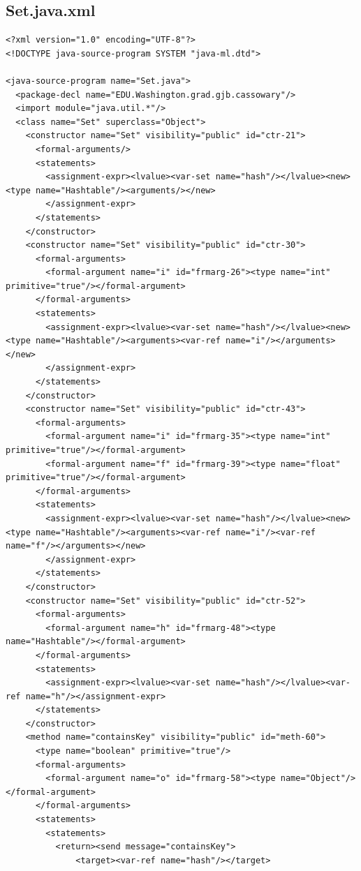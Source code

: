 \documentclass{article}
\begin{document}
\subsection{Set.java.xml}

{\small
\begin{verbatim}
<?xml version="1.0" encoding="UTF-8"?>
<!DOCTYPE java-source-program SYSTEM "java-ml.dtd">

<java-source-program name="Set.java">
  <package-decl name="EDU.Washington.grad.gjb.cassowary"/>
  <import module="java.util.*"/>
  <class name="Set" superclass="Object">
    <constructor name="Set" visibility="public" id="ctr-21">
      <formal-arguments/>
      <statements>
        <assignment-expr><lvalue><var-set name="hash"/></lvalue><new><type name="Hashtable"/><arguments/></new>
        </assignment-expr>
      </statements>
    </constructor>
    <constructor name="Set" visibility="public" id="ctr-30">
      <formal-arguments>
        <formal-argument name="i" id="frmarg-26"><type name="int" primitive="true"/></formal-argument>
      </formal-arguments>
      <statements>
        <assignment-expr><lvalue><var-set name="hash"/></lvalue><new><type name="Hashtable"/><arguments><var-ref name="i"/></arguments></new>
        </assignment-expr>
      </statements>
    </constructor>
    <constructor name="Set" visibility="public" id="ctr-43">
      <formal-arguments>
        <formal-argument name="i" id="frmarg-35"><type name="int" primitive="true"/></formal-argument>
        <formal-argument name="f" id="frmarg-39"><type name="float" primitive="true"/></formal-argument>
      </formal-arguments>
      <statements>
        <assignment-expr><lvalue><var-set name="hash"/></lvalue><new><type name="Hashtable"/><arguments><var-ref name="i"/><var-ref name="f"/></arguments></new>
        </assignment-expr>
      </statements>
    </constructor>
    <constructor name="Set" visibility="public" id="ctr-52">
      <formal-arguments>
        <formal-argument name="h" id="frmarg-48"><type name="Hashtable"/></formal-argument>
      </formal-arguments>
      <statements>
        <assignment-expr><lvalue><var-set name="hash"/></lvalue><var-ref name="h"/></assignment-expr>
      </statements>
    </constructor>
    <method name="containsKey" visibility="public" id="meth-60">
      <type name="boolean" primitive="true"/>
      <formal-arguments>
        <formal-argument name="o" id="frmarg-58"><type name="Object"/></formal-argument>
      </formal-arguments>
      <statements>
        <statements>
          <return><send message="containsKey">
              <target><var-ref name="hash"/></target>

\end{verbatim}}
\end{document}
